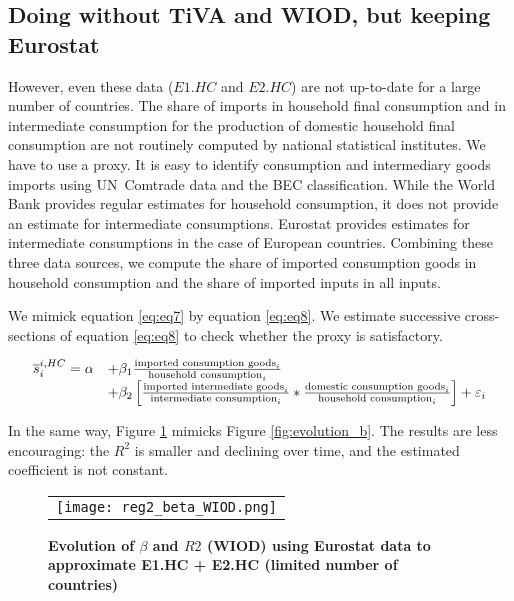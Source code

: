 \documentclass[12pt,a4paper]{paper}
\begin{document}
\subsection{Doing without TiVA and WIOD, but keeping Eurostat}
However, even these data ($E1.HC$ and $E2.HC$) are not up-to-date for a large number of countries. 
The share of imports in household final consumption and in intermediate consumption for the production of domestic household final consumption are not routinely computed by national statistical institutes. 
We have to use a proxy. It is easy to identify consumption and intermediary goods imports using UN Comtrade data and the BEC classification. 
While the World Bank provides regular estimates for household consumption, it does not provide an estimate for intermediate consumptions. Eurostat provides estimates for intermediate consumptions in the case of European countries.
Combining these three data sources, we compute the share of imported consumption goods in household consumption and the share of imported inputs in all inputs. 

We mimick equation \ref{eq:eq7} by equation \ref{eq:eq8}. 
We estimate successive cross-sections of equation \ref{eq:eq8} to check whether the proxy is satisfactory. 

 \begin{equation}
 \begin{array}{llll}
\overline{s}_{i}^{i,HC}= \alpha &+  \beta_1  \frac{\textnormal{imported consumption goods}_i}{\textnormal{household consumption}_i} \\ & +  \beta_2  \left[    \frac{\textnormal{imported intermediate goods}_i}{\textnormal{intermediate consumption}_i}*\frac{\textnormal{domestic consumption goods}_i}{\textnormal{household consumption}_i}\right] +\varepsilon_i 
\end{array} 
\label{eq:eq8}
\end{equation}


In the same way, Figure \ref{fig:evolution_b_reg2} mimicks Figure \ref{fig:evolution_b}. 
The results are less encouraging: the $R^2$ is smaller and declining over time, and the estimated coefficient is not constant.


\begin{figure}[H]
	\centering
	\caption{\footnotesize{\textbf{Evolution of $\beta$ and $R2$ (WIOD) using Eurostat data to approximate E1.HC + E2.HC (limited number of countries)}}}
	\begin{tabular}{c}
		\texttt{[image: reg2\_beta\_WIOD.png]}\\
	\end{tabular}
	\label{fig:evolution_b_reg2}
\end{figure}
\end{document}
